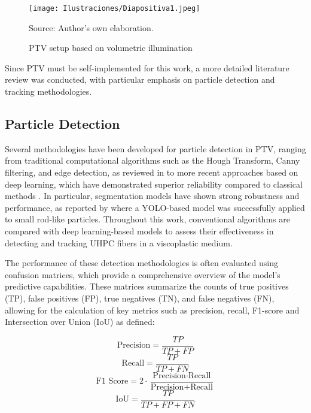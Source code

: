 \begin{figure}
    \centering
    \texttt{[image: Ilustraciones/Diapositiva1.jpeg]}
    \caption{PTV setup based on volumetric illumination}
    Source: Author's own elaboration.
    \label{ptvsetup2}
\end{figure}

Since PTV must be self-implemented for this work, a more detailed literature review was conducted, with particular emphasis on particle detection and tracking methodologies.

\subsection{Particle Detection}

Several methodologies have been developed for particle detection in PTV, ranging from traditional computational algorithms such as the Hough Transform, Canny filtering, and edge detection, as reviewed in \cite{seyfi2024simultaneous} to more recent approaches based on deep learning, which have demonstrated superior reliability compared to classical methods \cite{plaksyvyi2023}. In particular, segmentation models have shown strong robustness and performance, as reported by \cite{qamar2024segmentation} where a YOLO-based model was successfully applied to small rod-like particles. Throughout this work, conventional algorithms are compared with deep learning-based models to assess their effectiveness in detecting and tracking UHPC fibers in a viscoplastic medium.

The performance of these detection methodologies is often evaluated using confusion matrices, which provide a comprehensive overview of the model's predictive capabilities. These matrices summarize the counts of true positives (TP), false positives (FP), true negatives (TN), and false negatives (FN), allowing for the calculation of key metrics such as precision, recall, F1-score and Intersection over Union (IoU) as \cite{everingham2015pascal} defined:

\begin{equation}
    \text{Precision} = \frac{TP}{TP + FP}
\end{equation}
\begin{equation}
    \text{Recall} = \frac{TP}{TP + FN}
\end{equation}
\begin{equation}
    \text{F1 Score} = 2 \cdot \frac{\text{Precision} \cdot \text{Recall}}{\text{Precision} + \text{Recall}}
\end{equation}
\begin{equation}
    \text{IoU} = \frac{TP}{TP + FP + FN}
\end{equation}

